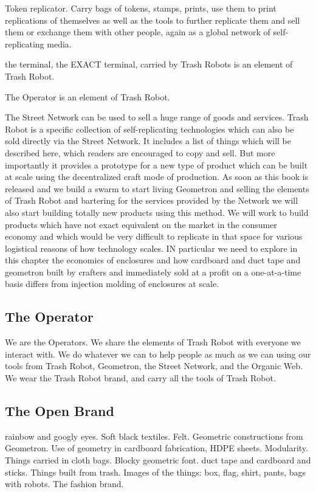 Token replicator.  Carry bags of tokens, stamps, prints, use them to print replications of themselves as well as the tools to further replicate them and sell them or exchange them with other people, again as a global network of self-replicating media.


the terminal, the EXACT terminal, carried by Trash Robots is an element of Trash Robot. 

The Operator is an element of Trash Robot.

The Street Network can be used to sell a huge range of goods and services.  Trash Robot is a specific collection of self-replicating technologies which can also be sold directly via the Street Network.  It includes a list of things which will be described here, which readers are encouraged to copy and sell.  But more importantly it provides a prototype for a new type of product which can be built at scale using the decentralized craft mode of production.  As soon as this book is released and we build a swarm to start living Geometron and selling the elements of Trash Robot and bartering for the services provided by the Network we will also start building totally new products using this method.  We will work to build products which have not exact equivalent on the market in the consumer economy and which would be very difficult to replicate in that space for various logistical reasons of how technology scales.   IN particular we need to explore in this chapter the economics of enclosures and how cardboard and duct tape and geometron built by crafters and immediately sold at a profit on a one-at-a-time basis differs from injection molding of enclosures at scale.  

\subsection{The Operator}

We are the Operators.  We share the elements of Trash Robot with everyone we interact with.  We do whatever we can to help people as much as we can using our tools from Trash Robot, Geometron, the Street Network, and the Organic Web.  We wear the Trash Robot brand, and carry all the tools of Trash Robot.

\subsection{The Open Brand}

rainbow and googly eyes.  Soft black textiles. Felt.  Geometric constructions from Geometron.  Use of geometry in cardboard fabrication, HDPE sheets. Modularity.  Things carried in cloth bags. Blocky geometric font.  duct tape and cardboard and sticks. Things built from trash.  Images of the things: box, flag, shirt, pants, bags with robots.  The fashion brand.  

